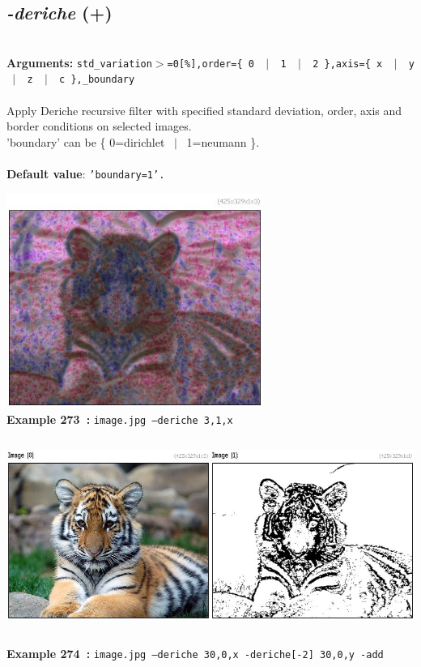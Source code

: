 \documentclass[a4paper,11pt,twoside]{book}
\begin{document}
\subsection{\emph{-deriche} (+)}\vspace*{-0.5em}
~\\\textbf{Arguments: } 
{\small \texttt{std\_variation$>$=0[\%],order=\{ 0 ~$|$~ 1 ~$|$~ 2 \},axis=\{ x ~$|$~ y ~$|$~ z ~$|$~ c \},\_boundary}}\\~\\
Apply Deriche recursive filter with specified standard deviation, order, axis and border
conditions on selected images.
~\\'boundary' can be \{ 0=dirichlet ~$|$~ 1=neumann \}.
~\\~\\\textbf{Default value}: {\small \texttt{'boundary=1'.}}
\begin{center}\includegraphics[keepaspectratio=true,height=7cm,width=\textwidth]{img/gmic_def273.jpg}\\
{\footnotesize \textbf{Example 273~:} \texttt{image.jpg --deriche 3,1,x}}
\\\includegraphics[keepaspectratio=true,height=7cm,width=\textwidth]{img/gmic_def274.jpg}\\
{\footnotesize \textbf{Example 274~:} \texttt{image.jpg --deriche 30,0,x -deriche[-2] 30,0,y -add}}
\end{center}
\end{document}
